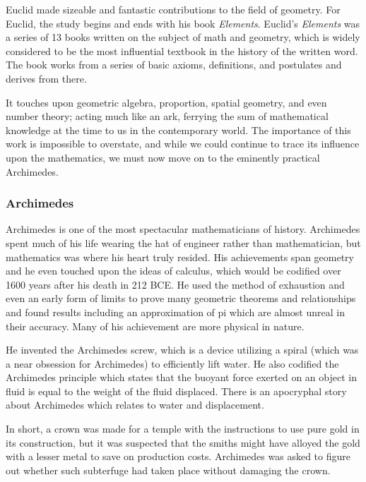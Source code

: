 Euclid made sizeable and fantastic contributions to the field of
geometry. For Euclid, the study begins and ends with his book \textit{Elements}. Euclid’s \textit{Elements} was a
series of 13 books written on the subject of math and geometry, which is widely considered to be
the most influential textbook in the history of the written word.
The book works from a series of basic axioms, definitions, and postulates
and derives from there.\newline

It
touches upon geometric algebra, proportion, spatial geometry, and even
number theory; acting much like an ark, ferrying the sum of mathematical knowledge at the time
to us in the contemporary world. The importance of this work is impossible to overstate,
and while
we could continue to trace its influence upon the mathematics, we must now move on to the
eminently practical Archimedes.

\subsubsection{Archimedes}
Archimedes is one of the most spectacular mathematicians of history. Archimedes spent
much of his life wearing the hat of engineer rather than mathematician, but mathematics was where
his heart truly resided. His achievements span geometry and he even touched upon the ideas of
calculus, which would be codified over 1600 years after his death in 212 BCE. He used the method of exhaustion and even an early form of limits to prove many geometric theorems and relationships and found results including an approximation of pi which
are almost unreal in their accuracy.
Many of his achievement are more physical in nature.\newline

 He
invented the Archimedes screw,
which is a device utilizing a spiral (which was a near obsession
for Archimedes) to efficiently lift water. He also codified the Archimedes
principle which states
that the buoyant force exerted on an object in fluid is equal to the weight of the fluid displaced.
There is an apocryphal story
about Archimedes which relates to water and displacement.\newline

In short,
a crown was made for a temple
with the instructions to use pure gold in its
construction, but it was
suspected that the smiths might have alloyed the gold with a lesser metal to save on production
costs. Archimedes was asked to figure out whether such subterfuge had taken place without
damaging the crown.\newline

